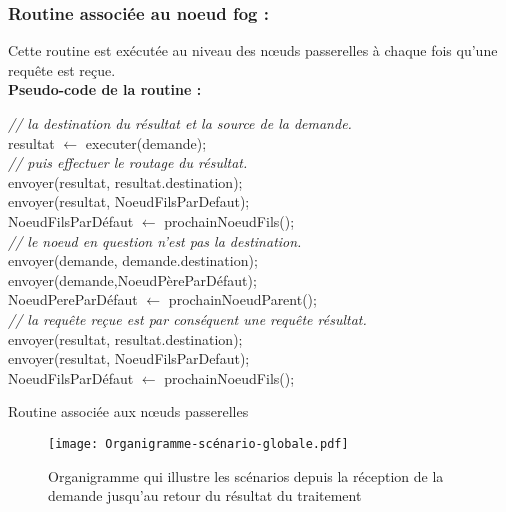 \subsubsection{Routine associée au noeud fog :}
Cette routine est exécutée au niveau des nœuds passerelles à chaque fois qu'une requête est reçue.\\
\textbf{Pseudo-code de la routine :}\\
\begin{algorithm}[H]
  {  
    { 
      \emph{// la destination du résultat et la source de la demande.}\\
      resultat $\gets$ executer(demande);\\
      \emph{// puis effectuer le routage du résultat.}\\
      {
        envoyer(resultat, resultat.destination);\\
      }
      {
        envoyer(resultat, NoeudFilsParDefaut);\\
        NoeudFilsParDéfaut $\gets$ prochainNoeudFils();\\
      }
    }
    {  
      \emph{// le noeud en question n'est pas la destination.}\\
      {
        envoyer(demande, demande.destination);\\
      }
      {
        envoyer(demande,NoeudPèreParDéfaut);\\
        NoeudPereParDéfaut $\gets$ prochainNoeudParent();\\
      }
    }
  }
  {
    \emph{// la requête reçue est par conséquent une requête résultat.}\\
    {
      envoyer(resultat, resultat.destination);\\
    }
    {
      envoyer(resultat, NoeudFilsParDefaut);\\
      NoeudFilsParDéfaut $\gets$ prochainNoeudFils();\\
    }
  }
  \caption{Routine associée aux nœuds passerelles}
\end{algorithm}
\begin{figure}[H]
    \centering
    \texttt{[image: Organigramme-scénario-globale.pdf]}
    \caption{Organigramme qui illustre les scénarios depuis la réception de la demande jusqu'au retour du résultat du traitement}
    \label{fig:Organigrame_scénario_globale}
\end{figure}

